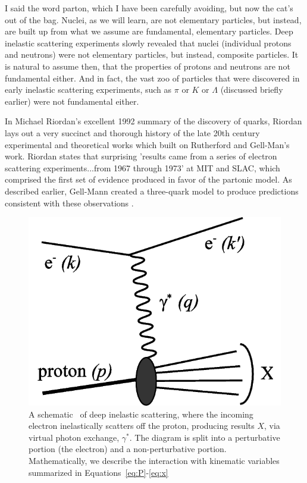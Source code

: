 I said the word parton, which I have been carefully avoiding, but now the cat's
out of the bag. Nuclei, as we will learn, are not elementary particles, but
instead, are built up from what we assume are fundamental, elementary particles.
Deep inelastic scattering experiments slowly revealed that nuclei (individual
protons and neutrons) were not elementary particles, but instead, composite
particles. It is natural to assume then, that the properties of protons and
neutrons are not fundamental either. And in fact, the vast zoo of particles that
were discovered in early inelastic scattering experiments, such as $\pi$ or $K$
or $\Lambda$ (discussed briefly earlier) were not fundamental either.

In Michael Riordan's excellent 1992 summary of the discovery of quarks, Riordan
lays out a very succinct and thorough history of the late 20th century
experimental and theoretical works which built on Rutherford and Gell-Man's
work. Riordan states that surprising 'results came from a
series of electron scattering experiments...from 1967 through 1973' at MIT and
SLAC, which comprised the first set of evidence produced in favor of the
partonic model. As described earlier, Gell-Mann created a three-quark model to
produce predictions consistent with these observations \cite{Riordan1992}.

\begin{figure}[ht]
	\centering
	\includegraphics[width=0.6\linewidth]{./figures/deep_inelastic_basic.png}
	\caption{
    A schematic~\cite{Ddn2_2008} of deep inelastic scattering, where the
    incoming electron inelastically scatters off the proton, producing results
    $X$, via virtual photon exchange, $\gamma^*$. The diagram is split into a
    perturbative portion (the electron) and a non-perturbative portion.
    Mathematically, we describe the interaction with kinematic variables
    summarized in Equations~\ref{eq:P}-\ref{eq:x}
  }
	\label{fig:disschematic}
\end{figure}

